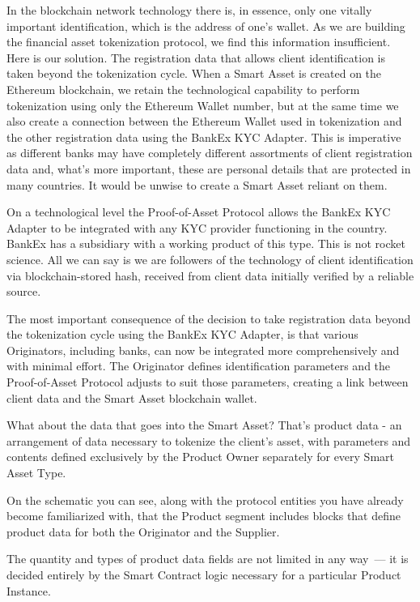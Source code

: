 \documentclass{article}
\begin{document}
\begin{multicols}{2}
In the blockchain network technology there is, in essence, only one vitally important identification, which is the address of one's wallet. As we are building the financial asset tokenization protocol, we find this information insufficient. 
Here is our solution. The registration data that allows client identification is taken beyond the tokenization cycle. When a Smart Asset is created on the Ethereum blockchain, we retain the technological capability to perform tokenization using only the Ethereum Wallet number, but at the same time we also create a connection between the Ethereum Wallet used in tokenization and the other registration data using the BankEx KYC Adapter. This is imperative as different banks may have completely different assortments of client registration data and, what’s more important, these are personal details that are protected in many countries. It would be unwise to create a Smart Asset reliant on them. 

On a technological level the Proof-of-Asset Protocol allows the BankEx KYC Adapter to be integrated with any KYC provider functioning in the country. BankEx has a subsidiary with a working product of this type. This is not rocket science. All we can say is we are followers of the technology of client identification via blockchain-stored hash, received from client data initially verified by a reliable source. 

The most important consequence of the decision to take registration data beyond the tokenization cycle using the BankEx KYC Adapter, is that various Originators, including banks, can now be integrated more comprehensively and with minimal effort. The Originator defines identification parameters and the Proof-of-Asset Protocol adjusts to suit those parameters, creating a link between client data and the Smart Asset blockchain wallet. 

What about the data that goes into the Smart Asset? That's product data - an arrangement of data necessary to tokenize the client’s asset, with parameters and contents defined exclusively by the Product Owner separately for every Smart Asset Type. 

On the schematic you can see, along with the protocol entities you have already become familiarized with, that the Product segment includes blocks that define product data for both the Originator and the Supplier.

The quantity and types of product data fields are not limited in any way~--- it is decided entirely by the Smart Contract logic necessary for a particular Product Instance. 


\end{multicols}
\end{document}
